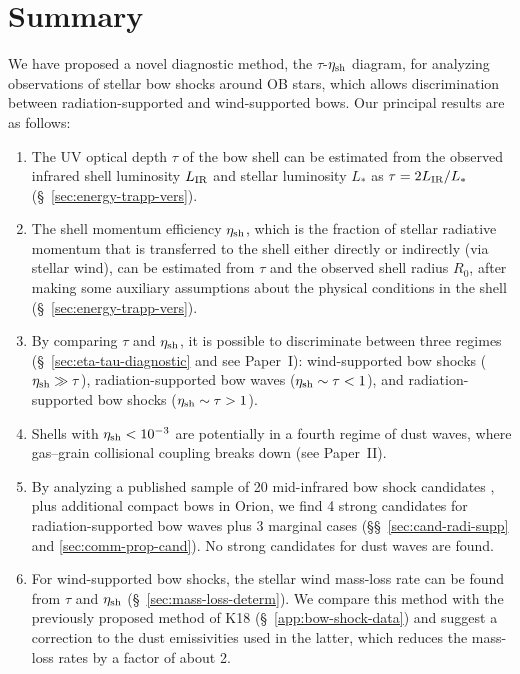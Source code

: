 \documentclass[useAMS, usenatbib, a4paper]{mnras}
\begin{document}
\section{Summary}
\label{sec:conclusions}

We have proposed a novel diagnostic method, the \(\tau\)-\(\eta_{\text{sh}}\)
diagram, for analyzing observations of stellar bow shocks around OB
stars, which allows discrimination between radiation-supported and
wind-supported bows.  Our principal results are as follows:
\begin{enumerate}[1.]
\item The UV optical depth \(\tau\) of the bow shell can be estimated
  from the observed infrared shell luminosity \(L_{\text{IR}}\) and stellar
  luminosity \(L_*\) as \(\tau = 2 L_{\text{IR}}/L_*\)
  (\S~\ref{sec:energy-trapp-vers}).
\item The shell momentum efficiency \(\eta_{\text{sh}}\), which is the
  fraction of stellar radiative momentum that is transferred to the
  shell either directly or indirectly (via stellar wind), can be
  estimated from \(\tau\) and the observed shell radius \(R_0\), after
  making some auxiliary assumptions about the physical conditions in
  the shell (\S~\ref{sec:energy-trapp-vers}).
\item By comparing \(\tau\) and \(\eta_{\text{sh}}\), it is possible to
  discriminate between three regimes (\S~\ref{sec:eta-tau-diagnostic}
  and see Paper~I): wind-supported bow shocks
  (\(\eta_{\text{sh}} \gg \tau\)), radiation-supported bow waves
  (\(\eta_{\text{sh}} \sim \tau < 1\)), and radiation-supported bow shocks
  (\(\eta_{\text{sh}} \sim \tau > 1\)).
\item Shells with \(\eta_{\text{sh}} < \num{e-3}\) are potentially in a
  fourth regime of dust waves, where gas--grain collisional coupling
  breaks down (see Paper~II).
\item By analyzing a published sample of 20 mid-infrared bow shock
  candidates \citep[K18]{Kobulnicky:2018a}, plus additional compact
  bows in Orion, we find 4 strong candidates for radiation-supported
  bow waves plus 3 marginal cases (\S\S~\ref{sec:cand-radi-supp} and
  \ref{sec:comm-prop-cand}).  No strong candidates for dust waves are
  found.
\item For wind-supported bow shocks, the stellar wind mass-loss rate
  can be found from \(\tau\) and \(\eta_{\text{sh}}\)
  (\S~\ref{sec:mass-loss-determ}). We compare this method with the
  previously proposed method of K18 (\S~\ref{app:bow-shock-data}) and
  suggest a correction to the dust emissivities used in the latter,
  which reduces the mass-loss rates by a factor of about 2.

\end{enumerate}
\end{document}
